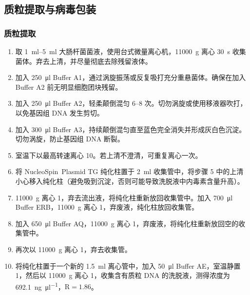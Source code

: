 \subsection{质粒提取与病毒包装}
\subsubsection{质粒提取}
\begin{enumerate}
    \item 取 \qtyrange{1}{5}{\ml} 大肠杆菌菌液，使用台式微量离心机，\qty{11000}{\g} 离心 \qty{30}{\s} 收集菌体。弃去上清，并尽量彻底去除残留液体。
    \item 加入 \qty{250}{\ul} Buffer A1，通过涡旋振荡或反复吸打充分重悬菌体。确保在加入 Buffer A2 前无明显细胞团块残留。
    \item 加入 \qty{250}{\ul} Buffer A2，轻柔颠倒混匀 \qtyrange{6}{8}{} 次。切勿涡旋或使用移液器吹打，以免基因组 DNA 发生剪切。
    \item 加入 \qty{300}{\ul} Buffer A3，持续颠倒混匀直至蓝色完全消失并形成灰白色沉淀。切勿涡旋，防止基因组 DNA 断裂。
    \item 室温下以最高转速离心 \qty{10}{\min}。若上清不澄清，可重复离心一次。
    \item 将 NucleoSpin\textregistered\ Plasmid TG 纯化柱置于 \qty{2}{\ml} 收集管中，将步骤 5 中的上清小心移入纯化柱（避免吸到沉淀，否则可能导致洗脱液中内毒素含量升高）。
    \item \qty{11000}{\g} 离心 \qty{1}{\min}，弃去流出液，将纯化柱重新放回收集管中。加入 \qty{700}{\ul} Buffer ERB，\qty{11000}{\g} 离心 \qty{1}{\min}，弃废液，纯化柱放回收集管。
    \item 加入 \qty{650}{\ul} Buffer AQ，\qty{11000}{\g} 离心 \qty{1}{\min}，弃废液，将纯化柱重新放回空的收集管中。
    \item 再次以 \qty{11000}{\g} 离心 \qty{1}{\min}，弃去收集管。
    \item 将纯化柱置于一个新的 \qty{1.5}{\ml} 离心管中，加入 \qty{50}{\ul} Buffer AE，室温静置 \qty{1}{\min}，然后以 \qty{11000}{\g} 离心 \qty{1}{\min}，收集含有质粒 DNA 的洗脱液，测得浓度为 \qty{692.1}{\ng \per \ul}，\(\mathrm{R} = 1.86\)。
\end{enumerate}

